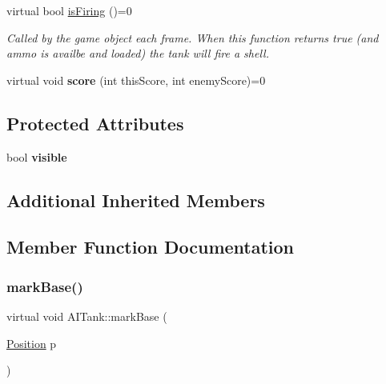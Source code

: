 \begin{DoxyCompactItemize}
\mbox{\label{class_a_i_tank_a00525c5df5a182733c2ac52031ff4e3f}} 
virtual bool \mbox{\hyperlink{class_a_i_tank_a00525c5df5a182733c2ac52031ff4e3f}{is\+Firing}} ()=0
\begin{DoxyCompactList}\small\item\em Called by the game object each frame. When this function returns true (and ammo is availbe and loaded) the tank will fire a shell. \end{DoxyCompactList}\item 
\mbox{\label{class_a_i_tank_a089bc85d0b3dcd4037f47ac35802c0c0}} 
virtual void {\bfseries score} (int this\+Score, int enemy\+Score)=0
\end{DoxyCompactItemize}
\subsection*{Protected Attributes}
\begin{DoxyCompactItemize}
\item 
\mbox{\label{class_a_i_tank_aa896a1b7d3d6888f2f920bf6c577e22e}} 
bool {\bfseries visible}
\end{DoxyCompactItemize}
\subsection*{Additional Inherited Members}


\subsection{Member Function Documentation}
\mbox{\label{class_a_i_tank_ac6d5bd1dbf2c4ccf3b6437ab17b3c5d9}} 
\subsubsection{\texorpdfstring{mark\+Base()}{markBase()}}
{\footnotesize\ttfamily virtual void A\+I\+Tank\+::mark\+Base (\begin{DoxyParamCaption}\item[{\mbox{\hyperlink{class_position}{Position}}}]{p }\end{DoxyParamCaption})\hspace{0.3cm}{\ttfamily [pure virtual]}}



